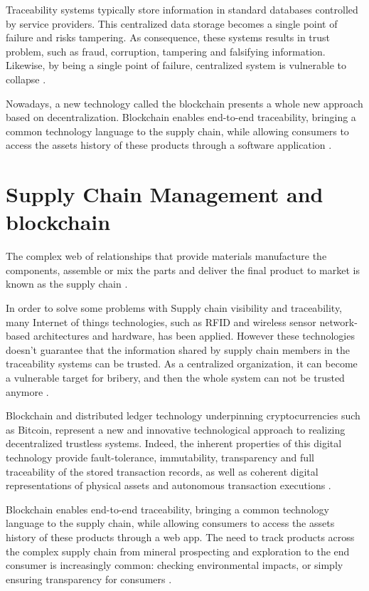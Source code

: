 \acresetall

Traceability systems typically store information in standard databases controlled by service providers. This centralized data storage becomes a single point of failure and risks tampering. As consequence, these systems results in trust problem, such as fraud, corruption, tampering and falsifying information. Likewise, by being a single point of failure, centralized system is vulnerable to collapse \cite{tian2017supply}.

Nowadays, a new technology called the blockchain presents a whole new approach based on decentralization. Blockchain enables end-to-end traceability, bringing a common technology language to the supply chain, while allowing consumers to access the assets history of these products through a software application \cite{galvez2018future}.

\section{Supply Chain Management and blockchain}\label{sec:scm}

The complex web of relationships that provide materials manufacture the components, assemble or mix the parts and deliver the final product to market is known as the supply chain \cite{buurman2002supply}.

In order to solve some problems with Supply chain visibility and traceability, many Internet of things technologies, such as RFID and wireless sensor network-based architectures and hardware, has been applied. However these technologies doesn't guarantee that the information shared by supply chain members in the traceability systems can be trusted. As a centralized organization, it can become a vulnerable target for bribery, and then the whole system can not be trusted anymore \cite{tian2017supply}.

Blockchain and distributed ledger technology underpinning cryptocurrencies such as Bitcoin, represent a new and innovative technological approach to realizing decentralized trustless systems. Indeed, the inherent properties of this digital technology provide fault-tolerance, immutability, transparency and full traceability of the stored transaction records, as well as coherent digital representations of physical assets and autonomous transaction executions \cite{caro2018blockchain}.

Blockchain enables end-to-end traceability, bringing a common technology language to the supply chain, while allowing consumers to access the assets history of these products through a web app. The need to track products across the complex supply chain from mineral prospecting and exploration to the end consumer is increasingly common: checking environmental impacts, or simply ensuring transparency for consumers \cite{galvez2018future}.

